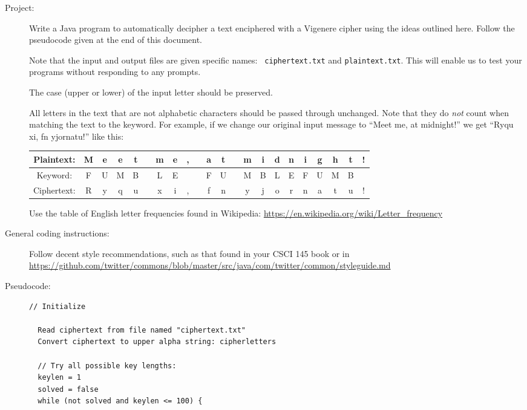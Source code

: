 \documentclass{article}
\begin{document}
\begin{description}
\item[Project:]  Write a Java program to automatically decipher a text
  enciphered with a Vigenere cipher using the ideas outlined here.
  Follow the pseudocode given at the end of this document.

  Note that
  the input and output files are given specific names: {\tt
    ciphertext.txt} and {\tt plaintext.txt}.  This will
  enable us to test your programs without responding to any prompts.

  The case (upper or lower) of the input letter should be preserved.
  
  All letters in the text that are not alphabetic characters should
  be passed through unchanged.  Note that they do {\em not} count when
  matching the text to the keyword.  For example, if we change our
  original input message to ``Meet me, at midnight!'' we get ``Ryqu
  xi, fn yjornatu!'' like this:


\begin{tabular}{|c|c|c|c|c|c|c|c|c|c|c|c|c|c|c|c|c|c|c|c|c|c|}
    \hline
  Plaintext: &  M&e&e&t& &m&e&,& &a&t& &m&i&d&n&i&g&h&t&!  \\\hline
  Keyword: &    F&U&M&B& &L&E& & &F&U& &M&B&L&E&F&U&M&B&  \\\hline
  Ciphertext: & R&y&q&u& &x&i&,& &f&n& &y&j&o&r&n&a&t&u&! \\\hline
\end{tabular}

  Use the table of English letter frequencies found in
  Wikipedia: {\url{https://en.wikipedia.org/wiki/Letter_frequency}}

  

  
\item[General coding instructions:]  Follow decent style
  recommendations,
  such as that found in your CSCI 145 book or in
  \url{https://github.com/twitter/commons/blob/master/src/java/com/twitter/common/styleguide.md}


  \newpage
  
\item[Pseudocode:]\mbox{}

\begin{Verbatim}[frame=single,label=Vigenere main]
  // Initialize

  Read ciphertext from file named "ciphertext.txt"
  Convert ciphertext to upper alpha string: cipherletters
  
  // Try all possible key lengths:
  keylen = 1
  solved = false
  while (not solved and keylen <= 100) {
    

\end{Verbatim}
\end{description}
\end{document}
